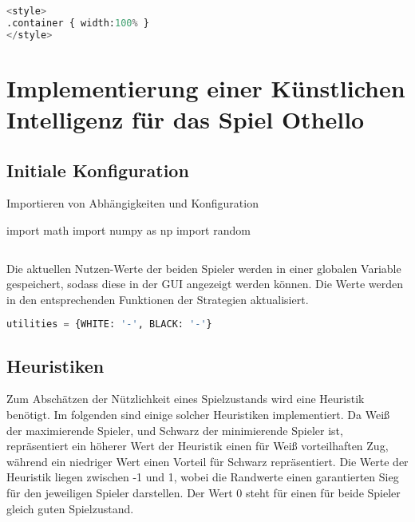 \begin{lstlisting}[language=Python]
%%HTML
<style>
.container { width:100% }
</style>
\end{lstlisting}

\hypertarget{implementierung-einer-kuxfcnstlichen-intelligenz-fuxfcr-das-spiel-othello}{%
\section{Implementierung einer Künstlichen Intelligenz für das Spiel
Othello}\label{implementierung-einer-kuxfcnstlichen-intelligenz-fuxfcr-das-spiel-othello}}

\hypertarget{initiale-konfiguration}{%
\subsection{Initiale Konfiguration}\label{initiale-konfiguration}}

Importieren von Abhängigkeiten und Konfiguration

import math import numpy as np import random

\begin{lstlisting}[language=Python]
%run othello_game.ipynb
\end{lstlisting}

Die aktuellen Nutzen-Werte der beiden Spieler werden in einer globalen
Variable gespeichert, sodass diese in der GUI angezeigt werden können.
Die Werte werden in den entsprechenden Funktionen der Strategien
aktualisiert.

\begin{lstlisting}[language=Python]
utilities = {WHITE: '-', BLACK: '-'}
\end{lstlisting}

\hypertarget{heuristiken}{%
\subsection{Heuristiken}\label{heuristiken}}

Zum Abschätzen der Nützlichkeit eines Spielzustands wird eine Heuristik
benötigt. Im folgenden sind einige solcher Heuristiken implementiert. Da
Weiß der maximierende Spieler, und Schwarz der minimierende Spieler ist,
repräsentiert ein höherer Wert der Heuristik einen für Weiß
vorteilhaften Zug, während ein niedriger Wert einen Vorteil für Schwarz
repräsentiert. Die Werte der Heuristik liegen zwischen -1 und 1, wobei
die Randwerte einen garantierten Sieg für den jeweiligen Spieler
darstellen. Der Wert 0 steht für einen für beide Spieler gleich guten
Spielzustand.

